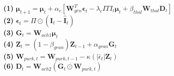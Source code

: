 \documentclass{article}
\begin{document}
\begin{center}

\vspace{0.5cm}
\begin{minipage}{\linewidth}
\footnotesize
\textbf{(1)} $\boldsymbol{\mu}_{t+1} = \boldsymbol{\mu}_{t} + \alpha_{c} \left[\mathbf{W}^{T}_{gen} \boldsymbol{\epsilon}_{t} - \lambda_{c} ITI_{t} \boldsymbol{\mu}_{t} + \beta_{thal} \mathbf{W}_{thal} \mathbf{D}_{t}\right]$ \\[1ex]
\textbf{(2)} $\boldsymbol{\epsilon}_{t} = \Pi \odot (\mathbf{I}_{t} - \hat{\mathbf{I}}_{t})$ \\[1ex]
\textbf{(3)} $\mathbf{G}_{t} = \mathbf{W}_{ach1} \boldsymbol{\mu}_{t}$ \\[1ex]
\textbf{(4)} $\mathbf{Z}_{t} = (1 - \beta_{gran}) \mathbf{Z}_{t-1} + \alpha_{gran} \mathbf{G}_{t}$ \\[1ex]
\textbf{(5)} $\mathbf{W}_{purk, t} = \mathbf{W}_{purk, t-1} - \kappa ( \left| \bar{\epsilon}_{t} \right| \mathbf{Z}_{t})$ \\[1ex]
\textbf{(6)} $\mathbf{D}_{t} = \mathbf{W}_{ach2} (\mathbf{G}_{t} \odot \mathbf{W}_{purk, t})$
\end{minipage}
\end{center}
\end{document}
